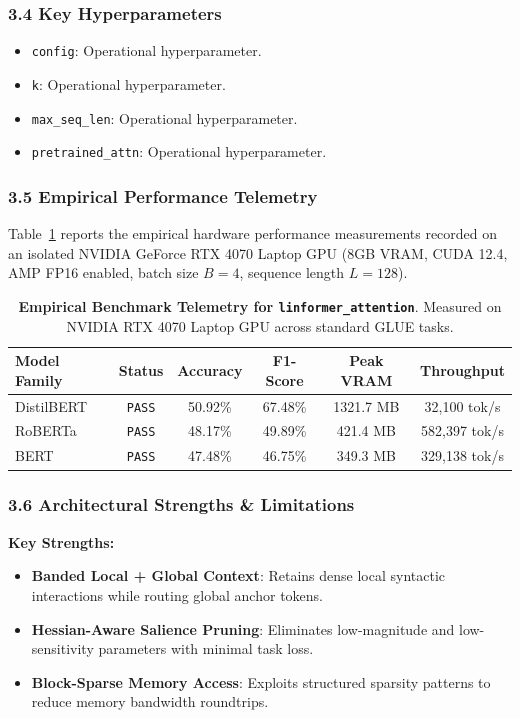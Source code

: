 \subsubsection*{3.4 Key Hyperparameters}
\begin{itemize}
    \item \texttt{config}: Operational hyperparameter.
    \item \texttt{k}: Operational hyperparameter.
    \item \texttt{max\_seq\_len}: Operational hyperparameter.
    \item \texttt{pretrained\_attn}: Operational hyperparameter.
\end{itemize}

\subsubsection*{3.5 Empirical Performance Telemetry}
Table~\ref{tab:telemetry_linformer_attention} reports the empirical hardware performance measurements recorded on an isolated NVIDIA GeForce RTX 4070 Laptop GPU (8GB VRAM, CUDA 12.4, AMP FP16 enabled, batch size $B=4$, sequence length $L=128$).

\begin{table}[h]
\centering
\small
\caption{\textbf{Empirical Benchmark Telemetry for \texttt{linformer\_attention}}. Measured on NVIDIA RTX 4070 Laptop GPU across standard GLUE tasks.}
\label{tab:telemetry_linformer_attention}
\begin{tabular*}{\columnwidth}{@{\extracolsep{\fill}}lccccc}
\toprule
\textbf{Model Family} & \textbf{Status} & \textbf{Accuracy} & \textbf{F1-Score} & \textbf{Peak VRAM} & \textbf{Throughput} \\
\midrule
DistilBERT & \texttt{PASS} & 50.92\% & 67.48\% & 1321.7 MB & 32,100 tok/s \\
RoBERTa & \texttt{PASS} & 48.17\% & 49.89\% & 421.4 MB & 582,397 tok/s \\
BERT & \texttt{PASS} & 47.48\% & 46.75\% & 349.3 MB & 329,138 tok/s \\
\bottomrule
\end{tabular*}
\end{table}

\subsubsection*{3.6 Architectural Strengths \& Limitations}
\textbf{Key Strengths:}
\begin{itemize}
    \item \textbf{Banded Local + Global Context}: Retains dense local syntactic interactions while routing global anchor tokens.
    \item \textbf{Hessian-Aware Salience Pruning}: Eliminates low-magnitude and low-sensitivity parameters with minimal task loss.
    \item \textbf{Block-Sparse Memory Access}: Exploits structured sparsity patterns to reduce memory bandwidth roundtrips.
\end{itemize}

